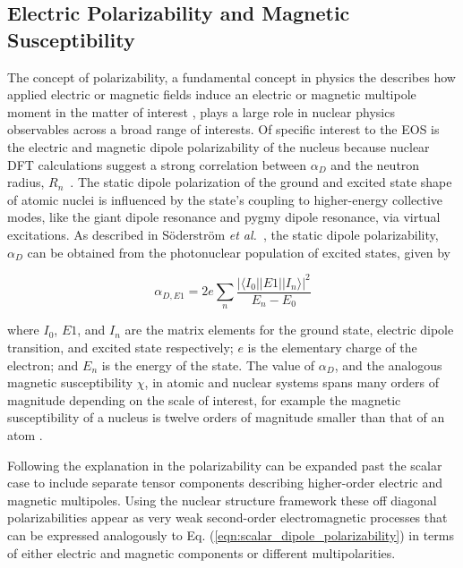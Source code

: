 \documentclass[cnatzke_thesis_proposal.tex]{subfiles}
\begin{document}
\subsection{Electric Polarizability and Magnetic Susceptibility}
The concept of polarizability, a fundamental concept in physics the describes how applied electric or magnetic fields induce an electric or magnetic multipole moment in the matter of interest \cite{jackson_classical_1999}, plays a large role in nuclear physics observables across a broad range of interests.
Of specific interest to the EOS is the electric and magnetic dipole polarizability of the nucleus because nuclear DFT calculations suggest a strong correlation between $\alpha_D$ and the neutron radius, $R_{n}$~\cite{hagen_neutron_2016}. 
The static dipole polarization of the ground and excited state shape of atomic nuclei is influenced by the state's coupling to higher-energy collective modes, like the giant dipole resonance and pygmy dipole resonance, via virtual excitations. 
As described in S\"oderstr\"om \textit{et al.}~\cite{soderstrom_electromagnetic_2020}, the static dipole polarizability, $\alpha_D$ can be obtained from the photonuclear population of excited states, given by

\begin{equation} \label{eqn:scalar_dipole_polarizability}
    \alpha_{D,E1} = 2 e \sum_n \frac{|\langle I_0 || E1 || I_n \rangle |^2}{E_n - E_0}
\end{equation}

where $I_0$, $E1$, and $I_n$ are the matrix elements for the ground state, electric dipole transition, and excited state respectively; $e$ is the elementary charge of the electron; and $E_n$ is the energy of the state. 
The value of $\alpha_D$, and the analogous magnetic susceptibility $\chi$, in atomic and nuclear systems spans many orders of magnitude depending on the scale of interest, for example the magnetic susceptibility of a nucleus is twelve orders of magnitude smaller than that of an atom \cite{knupfer_scaling_1985}.

Following the explanation in \cite{soderstrom_electromagnetic_2020} the polarizability can be expanded past the scalar case to include separate tensor components describing higher-order electric and magnetic multipoles. 
Using the nuclear structure framework these off diagonal polarizabilities appear as very weak second-order electromagnetic processes that can be expressed analogously to Eq. (\ref{eqn:scalar_dipole_polarizability}) in terms of either electric and magnetic components or different multipolarities. 
\end{document}
